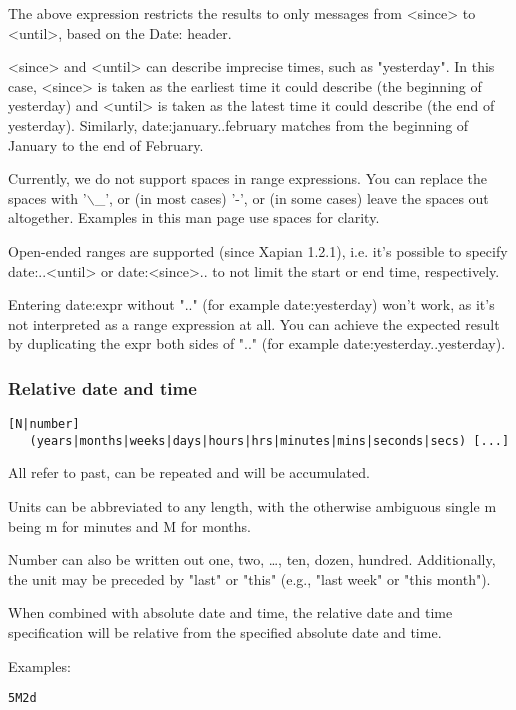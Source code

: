 \documentclass[a4,onecolumn,portrait]{article}
\begin{document}
The above expression restricts the results to only messages from <since> to <until>, based on the Date: header.

<since> and <until> can describe imprecise times, such as "yesterday". In this case, <since> is taken as the earliest time it could describe (the beginning of yesterday) and <until> is taken as the latest time it could describe (the end of yesterday).  Similarly, date:january..february matches from the beginning of January to the end of February.

Currently, we do not support spaces in range expressions. You can replace the spaces with '$\backslash$\_', or (in most cases) '-', or (in some cases) leave the spaces out altogether. Examples in this man page use spaces for clarity.

Open-ended ranges are supported (since Xapian 1.2.1), i.e. it's possible to specify date:..<until> or date:<since>.. to not limit the start or end time, respectively.

Entering date:expr without ".." (for example date:yesterday) won't work, as it's not interpreted as a range expression at all. You can achieve the expected result by duplicating the expr both sides of ".." (for example date:yesterday..yesterday).
\subsubsection{Relative date and time}
\label{sec-8-3-2}

\begin{verbatim}
[N|number]
   (years|months|weeks|days|hours|hrs|minutes|mins|seconds|secs) [...]
\end{verbatim}

All refer to past, can be repeated and will be accumulated.

Units can be abbreviated to any length, with the otherwise ambiguous single m being m for minutes and M for months.

Number can also be written out one, two, \ldots{}, ten, dozen, hundred.  Additionally, the unit may be preceded by "last" or "this" (e.g., "last week" or "this month").

When combined with absolute date and time, the relative date and time specification will be relative from the specified absolute date and time.

Examples:

\begin{verbatim}
5M2d
\end{verbatim}
\end{document}
